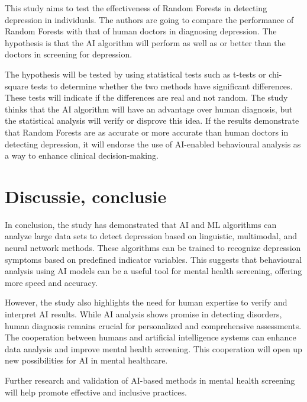 \documentclass[dutch]{hogent-article}
\begin{document}
This study aims to test the effectiveness of Random Forests in detecting depression in individuals. The authors are going to compare the performance of Random Forests with that of human doctors in diagnosing depression. The hypothesis is that the AI algorithm will perform as well as or better than the doctors in screening for depression.

The hypothesis will be tested by using statistical tests such as t-tests or chi-square tests to determine whether the two methods have significant differences. These tests will indicate if the differences are real and not random. The study thinks that the AI algorithm will have an advantage over human diagnosis, but the statistical analysis will verify or disprove this idea. If the results demonstrate that Random Forests are as accurate or more accurate than human doctors in detecting depression, it will endorse the use of AI-enabled behavioural analysis as a way to enhance clinical decision-making.



\section{Discussie, conclusie}%
\label{sec:discussion-conclusion}
In conclusion, the study has demonstrated that AI and ML algorithms can analyze large data sets to detect depression based on linguistic, multimodal, and neural network methods. These algorithms can be trained to recognize depression symptoms based on predefined indicator variables. This suggests that behavioural analysis using AI models can be a useful tool for mental health screening, offering more speed and accuracy.

However, the study also highlights the need for human expertise to verify and interpret AI results. While AI analysis shows promise in detecting disorders, human diagnosis remains crucial for personalized and comprehensive assessments. The cooperation between humans and artificial intelligence systems can enhance data analysis and improve mental health screening. This cooperation will open up new possibilities for AI in mental healthcare.

Further research and validation of AI-based methods in mental health screening will help promote effective and inclusive practices.




\printbibliography[heading=bibintoc]
\end{document}

